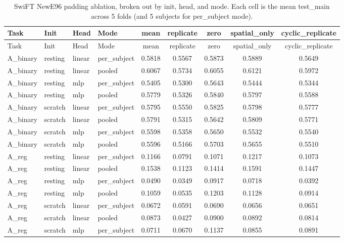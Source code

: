 \documentclass[10pt, a4paper, landscape]{article}
\begin{document}
\scriptsize
\setlength{\tabcolsep}{4pt}
\begin{longtable}{l l l l S[table-format=1.4] S[table-format=1.4] S[table-format=1.4] S[table-format=1.4] S[table-format=1.4] }
\caption{SwiFT NewE96 padding ablation, broken out by init, head, and mode. Each cell is the mean test\_main across 5 folds (and 5 subjects for per\_subject mode).} \label{tab:supp-padding-detail}\\
\toprule
Task & Init & Head & Mode & {mean} & {replicate} & {zero} & {spatial\_only} & {cyclic\_replicate} \\
\midrule
\endfirsthead
\toprule
Task & Init & Head & Mode & {mean} & {replicate} & {zero} & {spatial\_only} & {cyclic\_replicate} \\
\midrule
\endhead
\bottomrule
\endlastfoot
A\_binary & resting & linear & per\_subject & 0.5818 & 0.5567 & 0.5873 & 0.5889 & 0.5649\\
A\_binary & resting & linear & pooled & 0.6067 & 0.5734 & 0.6055 & 0.6121 & 0.5972\\
A\_binary & resting & mlp & per\_subject & 0.5405 & 0.5300 & 0.5643 & 0.5444 & 0.5344\\
A\_binary & resting & mlp & pooled & 0.5779 & 0.5326 & 0.5840 & 0.5797 & 0.5588\\
A\_binary & scratch & linear & per\_subject & 0.5795 & 0.5550 & 0.5825 & 0.5798 & 0.5777\\
A\_binary & scratch & linear & pooled & 0.5791 & 0.5315 & 0.5642 & 0.5809 & 0.5771\\
A\_binary & scratch & mlp & per\_subject & 0.5598 & 0.5358 & 0.5650 & 0.5532 & 0.5540\\
A\_binary & scratch & mlp & pooled & 0.5596 & 0.5166 & 0.5703 & 0.5655 & 0.5510\\
\midrule
A\_reg & resting & linear & per\_subject & 0.1166 & 0.0791 & 0.1071 & 0.1217 & 0.1073\\
A\_reg & resting & linear & pooled & 0.1538 & 0.1123 & 0.1414 & 0.1591 & 0.1447\\
A\_reg & resting & mlp & per\_subject & 0.0490 & 0.0349 & 0.0917 & 0.0718 & 0.0392\\
A\_reg & resting & mlp & pooled & 0.1059 & 0.0535 & 0.1203 & 0.1128 & 0.0914\\
A\_reg & scratch & linear & per\_subject & 0.0672 & 0.0591 & 0.0690 & 0.0656 & 0.0651\\
A\_reg & scratch & linear & pooled & 0.0873 & 0.0427 & 0.0900 & 0.0892 & 0.0814\\
A\_reg & scratch & mlp & per\_subject & 0.0711 & 0.0670 & 0.1137 & 0.0855 & 0.0891\\

\end{longtable}
\end{document}

